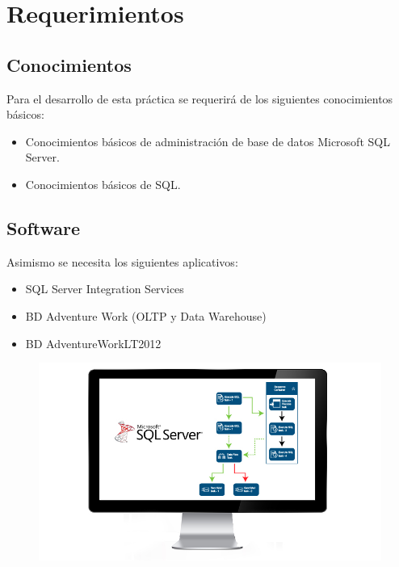 \documentclass{article}
\begin{document}
\section {\textbf{Requerimientos}}

\subsection{\textbf{Conocimientos}}
Para el desarrollo de esta práctica se requerirá de los siguientes conocimientos básicos:
\begin{itemize}
\item Conocimientos básicos de administración de base de datos Microsoft SQL Server.
\item Conocimientos básicos de SQL.
\end{itemize}



\subsection{\textbf{Software}}
Asimismo se necesita los siguientes aplicativos:
\begin{itemize}
\item SQL Server Integration Services
\item BD Adventure Work (OLTP y Data Warehouse)
\item BD AdventureWorkLT2012
\end{itemize}


	\begin{figure}[htb]
		\begin{center}
			\includegraphics[width=13cm]{./images/MS-SQL-Server-Integration-Services}
			
		\end{center}
	\end{figure}
\end{document}
